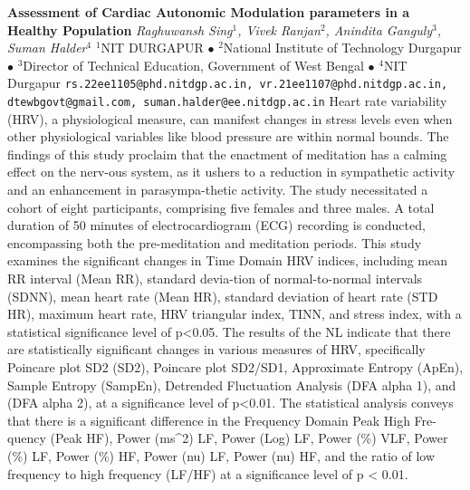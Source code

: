 
    \begin{conf-abstract}[]
        {\textbf{Assessment of Cardiac Autonomic Modulation parameters in a Healthy Population}}
        {\textit{Raghuwansh Sing$^{1}$, Vivek Ranjan$^{2}$, Anindita Ganguly$^{3}$, Suman Halder$^{4}$}}
        {$^{1}$NIT DURGAPUR $\bullet$ $^{2}$National Institute of Technology Durgapur $\bullet$ $^{3}$Director of Technical Education, Government of West Bengal $\bullet$ $^{4}$NIT Durgapur}
        {\texttt{rs.22ee1105@phd.nitdgp.ac.in, vr.21ee1107@phd.nitdgp.ac.in, dtewbgovt@gmail.com, suman.halder@ee.nitdgp.ac.in}}
        {Heart rate variability (HRV), a physiological measure, can manifest changes in stress levels even when other physiological variables like blood pressure are within normal bounds. The findings of this study proclaim that the enactment of meditation has a calming effect on the nerv-ous system, as it ushers to a reduction in sympathetic activity and an enhancement in parasympa-thetic activity. The study necessitated a cohort of eight participants, comprising five females and three males. A total duration of 50 minutes of electrocardiogram (ECG) recording is conducted, encompassing both the pre-meditation and meditation periods. This study examines the significant changes in Time Domain HRV indices, including mean RR interval (Mean RR), standard devia-tion of normal-to-normal intervals (SDNN), mean heart rate (Mean HR), standard deviation of heart rate (STD HR), maximum heart rate, HRV triangular index, TINN, and stress index, with a statistical significance level of p<0.05. The results of the NL indicate that there are statistically significant changes in various measures of HRV, specifically Poincare plot SD2 (SD2), Poincare plot SD2/SD1, Approximate Entropy (ApEn), Sample Entropy (SampEn), Detrended Fluctuation Analysis (DFA alpha 1), and (DFA alpha 2), at a significance level of p<0.01. The statistical analysis conveys that there is a significant difference in the Frequency Domain Peak High Fre-quency (Peak HF), Power (ms^2) LF, Power (Log) LF, Power (\%) VLF, Power (\%) LF, Power (\%) HF, Power (nu) LF, Power (nu) HF, and the ratio of low frequency to high frequency (LF/HF) at a significance level of p < 0.01.}
    \end{conf-abstract}
        
